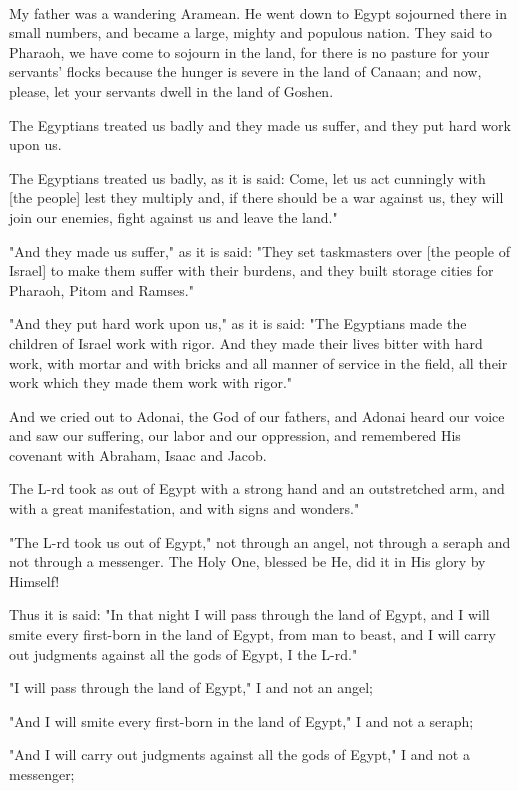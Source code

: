 \documentclass[a4paper,12pt,openany]{memoir}
\newenvironment{HgEnglish}{\strut\\\noindent}{\vspace{1em}}
\begin{document}
\begin{HgEnglish}
My father was a wandering Aramean. He went down to Egypt sojourned
there in small numbers, and became a large, mighty and populous
nation. They said to Pharaoh, we have come to sojourn in the land, for
there is no pasture for your servants' flocks because the hunger is
severe in the land of Canaan; and now, please, let your servants dwell
in the land of Goshen.

The Egyptians treated us badly and they made us suffer, and they put hard work upon us.

The Egyptians treated us badly, as it is said: Come, let us act cunningly with [the people] lest they multiply and, if there should be a war against us, they will join our enemies, fight against us and leave the land."

"And they made us suffer," as it is said: "They set taskmasters over [the people of Israel] to make them suffer with their burdens, and they built storage cities for Pharaoh, Pitom and Ramses."

"And they put hard work upon us," as it is said: "The Egyptians made the children of Israel work with rigor. And they made their lives bitter with hard work, with mortar and with bricks and all manner of service in the field, all their work which they made them work with rigor."

And we cried out to Adonai, the God of our fathers, and Adonai heard
our voice and saw our suffering, our labor and our oppression, and
remembered His covenant with Abraham, Isaac and Jacob.

The L-rd took as out of Egypt with a strong hand and an outstretched arm, and with a great manifestation, and with signs and wonders."

"The L-rd took us out of Egypt," not through an angel, not through a seraph and not through a messenger. The Holy One, blessed be He, did it in His glory by Himself!

Thus it is said: "In that night I will pass through the land of Egypt, and I will smite every first-born in the land of Egypt, from man to beast, and I will carry out judgments against all the gods of Egypt, I the L-rd."

"I will pass through the land of Egypt," I and not an angel;

"And I will smite every first-born in the land of Egypt," I and not a seraph;

"And I will carry out judgments against all the gods of Egypt," I and not a messenger;


\end{HgEnglish}
\end{document}
